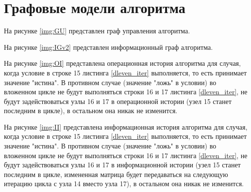 \section{Графовые модели алгоритма}
На рисунке \ref{img:GU} представлен граф управления алгоритма.


На рисунке \ref{img:IGv2} представлен информационный граф алгоритма.


\clearpage

На рисунке \ref{img:OI} представлена операционная история алгоритма для случая, когда условие в строке 15 листинга \ref{dleven_iter} выполняется, то есть принимает значение "истина". В противном случае (значение "ложь" в условии) во вложенном цикле не будут выполняться строки 16 и 17 листинга \ref{dleven_iter}, не будут задействоваться узлы 16 и 17 в операционной истории (узел 15 станет последним в цикле), в остальном она никак не изменится.


\clearpage

На рисунке \ref{img:II} представлена информационная история алгоритма для случая, когда условие в строке 15 листинга \ref{dleven_iter} выполняется, то есть принимает значение "истина". В противном случае (значение "ложь" в условии) во вложенном цикле не будут выполняться строки 16 и 17 листинга \ref{dleven_iter}, не будут задействоваться узлы 16 и 17 в информационной истории (узел 15 станет последним в цикле, измененная матрица будет передаваться на следующую итерацию цикла с узла 14 вместо узла 17), в остальном она никак не изменится.

